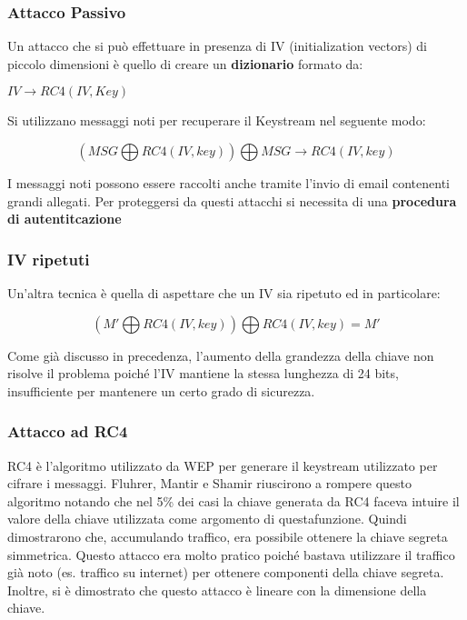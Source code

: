 \documentclass{article}
\theoremstyle{remark}
\begin{document}
\subsubsection{Attacco Passivo}
Un attacco che si può effettuare in presenza di IV (initialization vectors) di piccolo dimensioni è quello di creare un \textbf{dizionario} formato da:
\begin{center}
    $IV\rightarrow RC4(IV,Key)$
\end{center}
Si utilizzano messaggi noti per recuperare il Keystream nel seguente modo:
\begin{center}
    \begin{equation}
        (MSG\bigoplus RC4(IV,key))\bigoplus MSG\rightarrow RC4(IV,key)
    \end{equation}
\end{center}
I messaggi noti possono essere raccolti anche tramite l'invio di email contenenti grandi allegati. Per proteggersi da questi attacchi si necessita di una \textbf{procedura di autentitcazione}
\subsubsection{IV ripetuti}
Un'altra tecnica è quella di aspettare che un IV sia ripetuto ed in particolare:
\begin{center}
    \begin{equation}
        (M'\bigoplus RC4(IV,key))\bigoplus RC4(IV,key)=M'
    \end{equation}
\end{center}
Come già discusso in precedenza, l'aumento della grandezza della chiave non risolve il problema poiché l'IV mantiene la stessa lunghezza di 24 bits, insufficiente per mantenere un certo grado di sicurezza.
\subsubsection{Attacco ad RC4}
RC4 è l'algoritmo utilizzato da WEP per generare il keystream utilizzato per cifrare i messaggi. Fluhrer, Mantir e Shamir riuscirono a rompere questo algoritmo notando che nel 5\% dei casi la chiave generata da RC4 faceva intuire il valore della chiave utilizzata come argomento di questafunzione. Quindi dimostrarono che, accumulando traffico, era possibile ottenere la chiave segreta simmetrica.
Questo attacco era molto pratico poiché bastava utilizzare il traffico già noto (es. traffico su internet) per ottenere componenti della chiave segreta. Inoltre, si è dimostrato che questo attacco è lineare con la dimensione della chiave.
\end{document}
